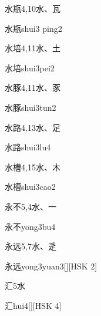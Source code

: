 \begin{entry}{水瓶}{4,10}{⽔、⽡}
  \begin{phonetics}{水瓶}{shui3 ping2}
  \end{phonetics}
\end{entry}

\begin{entry}{水培}{4,11}{⽔、⼟}
  \begin{phonetics}{水培}{shui3pei2}
  \end{phonetics}
\end{entry}

\begin{entry}{水豚}{4,11}{⽔、⾗}
  \begin{phonetics}{水豚}{shui3tun2}
  \end{phonetics}
\end{entry}

\begin{entry}{水路}{4,13}{⽔、⾜}
  \begin{phonetics}{水路}{shui3lu4}
  \end{phonetics}
\end{entry}

\begin{entry}{水槽}{4,15}{⽔、⽊}
  \begin{phonetics}{水槽}{shui3cao2}
  \end{phonetics}
\end{entry}

\begin{entry}{永不}{5,4}{⽔、⼀}
  \begin{phonetics}{永不}{yong3bu4}
  \end{phonetics}
\end{entry}

\begin{entry}{永远}{5,7}{⽔、⾡}
  \begin{phonetics}{永远}{yong3yuan3}[][HSK 2]
  \end{phonetics}
\end{entry}

\begin{entry}{汇}{5}{⽔}
  \begin{phonetics}{汇}{hui4}[][HSK 4]
  \end{phonetics}
\end{entry}

